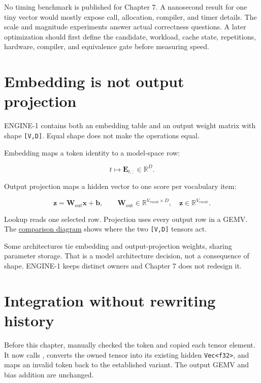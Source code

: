 No timing benchmark is published for Chapter 7. A nanosecond result for
one tiny vector would mostly expose call, allocation, compiler, and
timer details. The scale and magnitude experiments answer actual
correctness questions. A later optimization should first define the
candidate, workload, cache state, repetitions, hardware, compiler, and
equivalence gate before measuring speed.

\section{Embedding is not output
projection}\label{embedding-is-not-output-projection}

ENGINE-1 contains both an embedding table and an output weight matrix
with shape \texttt{{[}V,D{]}}. Equal shape does not make the operations
equal.

Embedding maps a token identity to a model-space row:

\begin{equation}
t\longmapsto\mathbf{E}_{t,:}\in\mathbb{R}^{D}.
\end{equation}

Output projection maps a hidden vector to one score per vocabulary item:

\begin{equation}
\mathbf{z}=\mathbf{W}_{\mathrm{out}}\mathbf{x}+\mathbf{b},
\qquad
\mathbf{W}_{\mathrm{out}}\in
\mathbb{R}^{V_{\mathrm{vocab}}\times D},
\quad
\mathbf{z}\in\mathbb{R}^{V_{\mathrm{vocab}}}.
\end{equation}

Lookup reads one selected row. Projection uses every output row in a
GEMV. The
\href{https://github.com/hermonai/inside-the-llm-engine/blob/astra-visual-rewrite/diagrams/transformer/embedding-vs-output-projection.txt}{comparison
diagram} shows where the two \texttt{{[}V,D{]}} tensors act.

Some architectures tie embedding and output-projection weights, sharing
parameter storage. That is a model architecture decision, not a
consequence of shape. ENGINE-1 keeps distinct owners and Chapter 7 does
not redesign it.

\section{Integration without rewriting
history}\label{integration-without-rewriting-history}

Before this chapter,
\texttt{} manually checked
the token and copied each tensor element. It now calls
\texttt{}, converts the owned
tensor into its existing hidden
\texttt{Vec\textless{}f32\textgreater{}}, and maps an invalid token back
to the established \texttt{}
variant. The output GEMV and bias addition are unchanged.

